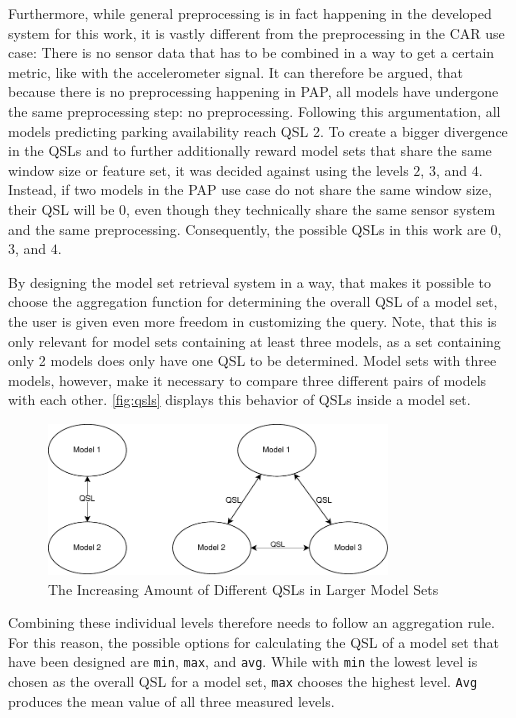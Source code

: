 Furthermore, while general preprocessing is in fact happening in the developed system for this work, it is vastly different from the preprocessing in the CAR use case: There is no sensor data that has to be combined in a way to get a certain metric, like with the accelerometer signal. It can therefore be argued, that because there is no preprocessing happening in PAP, all models have undergone the same preprocessing step: no preprocessing. Following this argumentation, all models predicting parking availability reach QSL 2. To create a bigger divergence in the QSLs and to further additionally reward model sets that share the same window size or feature set, it was decided against using the levels $2$, $3$, and $4$. Instead, if two models in the PAP use case do not share the same window size, their QSL will be $0$, even though they technically share the same sensor system and the same preprocessing. Consequently, the possible QSLs in this work are $0$, $3$, and $4$.

By designing the model set retrieval system in a way, that makes it possible to choose the aggregation function for determining the overall QSL of a model set, the user is given even more freedom in customizing the query. Note, that this is only relevant for model sets containing at least three models, as a set containing only 2 models does only have one QSL to be determined. Model sets with three models, however, make it necessary to compare three different pairs of models with each other. \autoref{fig:qsls} displays this behavior of QSLs inside a model set. 

\begin{figure}[htbp]
  \centering
\includegraphics[height=4cm]{graphics/qsl}
  \caption{The Increasing Amount of Different QSLs in Larger Model Sets}
  \label{fig:qsls}
\end{figure}

Combining these individual levels therefore needs to follow an aggregation rule. For this reason, the possible options for calculating the QSL of a model set that have been designed are \texttt{min}, \texttt{max}, and \texttt{avg}. While with \texttt{min} the lowest level is chosen as the overall QSL for a model set, \texttt{max} chooses the highest level. \texttt{Avg} produces the mean value of all three measured levels.

